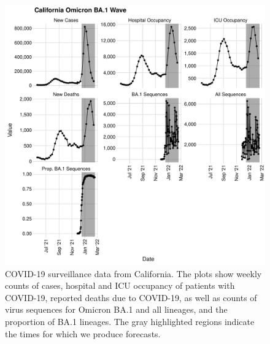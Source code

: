 \begin{figure}
    \centering
    \includegraphics[width=1.0\columnwidth]{california_binned_data_plot.pdf}
    \caption[COVID-19 surveillance data from California.]{
COVID-19 surveillance data from California.
The plots show weekly counts of cases, hospital and ICU occupancy of patients with COVID-19, reported deaths due to COVID-19, as well as counts of virus sequences for Omicron BA.1 and all lineages, and the proportion of BA.1 lineages.
The gray highlighted regions indicate the times for which we produce forecasts.}
    \label{ch_5:fig:california_binned_data_plot}
\end{figure}

